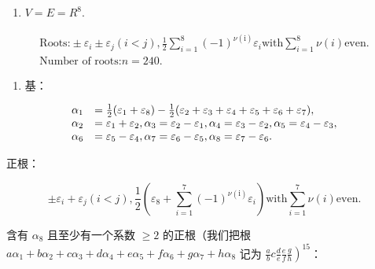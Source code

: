 
\begin{enumerate}
\def\labelenumi{(\Roman{enumi})}
\tightlist
\item
  \(V = E = R^{8}.\)
\end{enumerate}

\[
\begin{array}{l} \text {Roots:} \pm \varepsilon_ {i} \pm \varepsilon_ {j} (i <   j), \frac {1}{2} \sum_ {i = 1} ^ {8} (- 1) ^ {\nu (\mathrm{i})} \varepsilon_ {i} \text {with} \sum_ {i = 1} ^ {8} \nu (i) \text {even.} \\ \text {Number of roots:} n = 240. \end{array}
\]

\begin{enumerate}
\def\labelenumi{(\Roman{enumi})}
\setcounter{enumi}{1}
\tightlist
\item
  基：
\end{enumerate}

\[
\begin{array}{r l} \alpha_ {1} & = \frac {1}{2} (\varepsilon_ {1} + \varepsilon_ {8}) - \frac {1}{2} (\varepsilon_ {2} + \varepsilon_ {3} + \varepsilon_ {4} + \varepsilon_ {5} + \varepsilon_ {6} + \varepsilon_ {7}), \\ \alpha_ {2} & = \varepsilon_ {1} + \varepsilon_ {2}, \alpha_ {3} = \varepsilon_ {2} - \varepsilon_ {1}, \alpha_ {4} = \varepsilon_ {3} - \varepsilon_ {2}, \alpha_ {5} = \varepsilon_ {4} - \varepsilon_ {3}, \\ \alpha_ {6} & = \varepsilon_ {5} - \varepsilon_ {4}, \alpha_ {7} = \varepsilon_ {6} - \varepsilon_ {5}, \alpha_ {8} = \varepsilon_ {7} - \varepsilon_ {6}. \end{array}
\]

正根：

\[
\pm \varepsilon_ {i} + \varepsilon_ {j} (i <   j), \frac {1}{2} (\varepsilon_ {8} + \sum_ {i = 1} ^ {7} (- 1) ^ {\nu (\mathrm{i})} \varepsilon_ {i}) \text {with} \sum_ {i = 1} ^ {7} \nu (i) \text {even}.
\]

含有 \(\alpha_{8}\) 且至少有一个系数 \(\geqslant 2\) 的正根（我们把根 \(a\alpha_{1} + b\alpha_{2} + c\alpha_{3} + d\alpha_{4} + e\alpha_{5} + f\alpha_{6} + g\alpha_{7} + h\alpha_{8}\) 记为 \(\left.\frac{a}{b}c\frac{d}{e}\frac{e}{f}\frac{g}{h}\right)^{15}\)：

